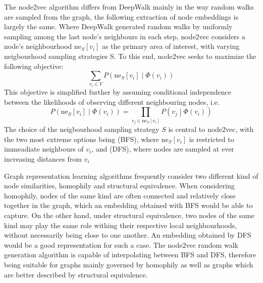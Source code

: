The node2vec algorithm differs from DeepWalk mainly in the way random walks are sampled from the graph, the following extraction of node embeddings is largely the same. Where DeepWalk generated random walks by uniformly sampling among the last node's neighbours in each step, node2vec considers a node's neighbourhood \( \mathrm{ne}_S [ v_i ] \) as the primary area of interest, with varying neigbourhood sampling strategies S. To this end, node2vec seeks to maximize the following objective:
\begin{equation}\label{eq:node2vec-objective}
	\sum_{v_i \in V} P \left( \mathrm{ne}_S[v_i] \middle| \Phi \left( v_i \right) \right)
\end{equation}
This objective is simplified further by assuming conditional independence between the likelihoods of observing different neighbouring nodes, i.e.
\begin{equation}
	P \left( \mathrm{ne}_S[v_i] \middle| \Phi \left( v_i \right) \right) = \prod_{v_j \in \mathrm{ne}_S[v_i]} P \left( v_j \middle| \Phi \left( v_i \right) \right)
\end{equation}
The choice of the neigbourhood sampling strategy \( S \) is central to node2vec, with the two most extreme options being  (BFS), where \( \mathrm{ne}_S [ v_i ] \) is restricted to immeadiate neighbours of \( v_i \), and  (DFS), where nodes are sampled at ever increasing distances from \( v_i \)

Graph representation learning algorithms frequently consider two different kind of node similarities, homophily and structural equivalence. When considering homophily, nodes of the same kind are often connected and relatively close together in the graph, which an embedding obtained with BFS would be able to capture. On the other hand, under structural equivalence, two nodes of the same kind may play the same role withing their respective local neighbourhoods, without necessarily being close to one another. An embedding obtained by DFS would be a good representation for such a case. The node2vec random walk generation algorithm is capable of interpolating between BFS and DFS, therefore being suitable for graphs mainly governed by homophily as well as graphs which are better described by structural equivalence.

